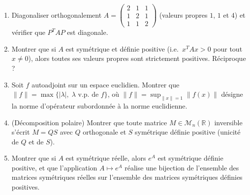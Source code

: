 \begin{mdframed}[style=exobar]
  \begin{enumerate}
    \item Diagonaliser orthogonalement
          $A = \begin{pmatrix}2&1&1\\1&2&1\\1&1&2\end{pmatrix}$
          (valeurs propres $1$, $1$ et $4$)
          et vérifier que $P^TAP$ est diagonale.

    \item Montrer que si $A$ est symétrique et définie positive (i.e.\
          $x^T A x > 0$ pour tout $x\neq 0$), alors toutes ses valeurs
          propres sont strictement positives. Réciproque ?

    \item Soit $f$ autoadjoint sur un espace euclidien. Montrer que
          $\|f\| = \max\{|\lambda|,\;\lambda\text{ v.p. de }f\}$, où
          $\|f\| = \sup_{\|x\|=1}\|f(x)\|$ désigne la norme d'opérateur
          subordonnée à la norme euclidienne.

    \item (Décomposition polaire) Montrer que toute matrice $M\in\mathcal{M}_n(\mathbb{R})$
          inversible s'écrit $M = QS$ avec $Q$ orthogonale et $S$ symétrique
          définie positive (unicité de $Q$ et de $S$).

    \item Montrer que si $A$ est symétrique réelle, alors $e^A$ est
          symétrique définie positive, et que l'application
          $A\mapsto e^A$ réalise une bijection de l'ensemble des matrices
          symétriques réelles sur l'ensemble des matrices symétriques
          définies positives.
  \end{enumerate}
\end{mdframed}

